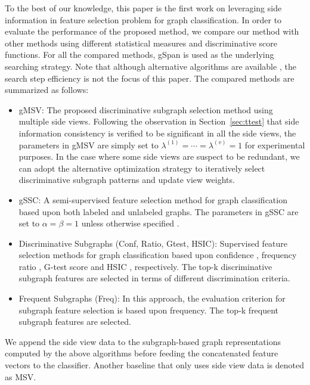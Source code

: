 \documentclass[conference]{IEEEtran}
\newcommand{\galgo}[0]{gMSV}
\newcommand{\gssc}[0]{gSSC}
\newcommand{\duga}[0]{Conf}
\newcommand{\dugb}[0]{Ratio}
\newcommand{\dugc}[0]{Gtest}
\newcommand{\dugd}[0]{HSIC}
\newcommand{\topk}[0]{Freq}
\newcommand{\side}[0]{MSV}
\begin{document}
To the best of our knowledge, this paper is the first work on leveraging side information in feature selection problem for graph classification. In order to evaluate the performance of the proposed method, we compare our method with other methods using different statistical measures and discriminative score functions. For all the compared methods, gSpan \cite{yan2002gspan} is used as the underlying searching strategy. Note that although alternative algorithms are available \cite{yan2008mining,jin2009graph,jin2010gaia}, the search step efficiency is not the focus of this paper. The compared methods are summarized as follows:
\begin{itemize}
\item {\galgo}: The proposed discriminative subgraph selection method using multiple side views. Following the observation in Section~\ref{sec:ttest} that side information consistency is verified to be significant in all the side views, the parameters in {\galgo} are simply set to $\lambda^{(1)}=\cdots=\lambda^{(v)}=1$ for experimental purposes. In the case where some side views are suspect to be redundant, we can adopt the alternative optimization strategy to iteratively select discriminative subgraph patterns and update view weights.
\item {\gssc}: A semi-supervised feature selection method for graph classification based upon both labeled and unlabeled graphs. The parameters in gSSC are set to $\alpha=\beta=1$ unless otherwise specified \cite{kong2010semi}.
\item Discriminative Subgraphs ({\duga}, {\dugb}, {\dugc}, {\dugd}): Supervised feature selection methods for graph classification based upon confidence \cite{gao2010direct}, frequency ratio \cite{jin2011lts,jin2010gaia,jin2009graph}, G-test score \cite{yan2008mining} and HSIC \cite{kong2010multi}, respectively. The top-k discriminative subgraph features are selected in terms of different discrimination criteria.
\item Frequent Subgraphs ({\topk}): In this approach, the evaluation criterion for subgraph feature selection is based upon frequency. The top-k frequent subgraph features are selected.
\end{itemize}

We append the side view data to the subgraph-based graph representations computed by the above algorithms before feeding the concatenated feature vectors to the classifier. Another baseline that only uses side view data is denoted as {\side}.
\end{document}
